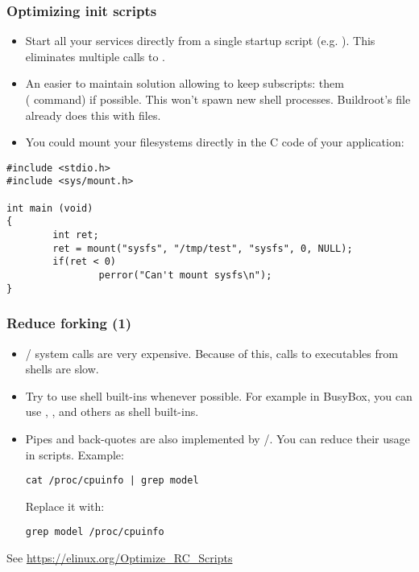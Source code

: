 \begin{frame}[fragile]
\frametitle{Optimizing init scripts}
\begin{itemize}
	\item Start all your services directly from a single startup
	      script (e.g. ). This eliminates multiple
	      calls to .
	\item An easier to maintain solution allowing to keep subscripts:  them\\
              ( command) if possible. This won't spawn new shell
              processes. Buildroot's  file already
              does this with  files.
	\item You could mount your filesystems directly in the C code
	      of your application:
\end{itemize}
\begin{block}{}
\begin{verbatim}
#include <stdio.h>
#include <sys/mount.h>

int main (void)
{
        int ret;
        ret = mount("sysfs", "/tmp/test", "sysfs", 0, NULL);
        if(ret < 0)
                perror("Can't mount sysfs\n");
}
\end{verbatim}
\end{block}
\end{frame}

\begin{frame}[fragile]
\frametitle{Reduce forking (1)}
\begin{itemize}
\item {}/ system calls are very expensive.
      Because of this, calls to executables from shells are slow.
\item Try to use shell built-ins whenever possible. For example in
      BusyBox, you can use , , 
      and others as shell built-ins.
\item Pipes and back-quotes are also implemented by
      /.  You can reduce their usage in
      scripts. Example:
      \begin{block}{}
      \begin{verbatim}
cat /proc/cpuinfo | grep model
      \end{verbatim}
      \end{block}
Replace it with:
      \begin{block}{}
      \begin{verbatim}
grep model /proc/cpuinfo
      \end{verbatim}
      \end{block}
\end{itemize}
See \url{https://elinux.org/Optimize_RC_Scripts}
\end{frame}

